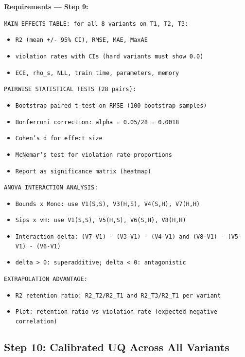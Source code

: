 \documentclass[12pt,a4paper]{article}
\begin{document}
\begin{promptbox}
\textbf{Requirements --- Step 9:}

\texttt{MAIN EFFECTS TABLE: for all 8 variants on T1, T2, T3:}
\begin{itemize}[noitemsep]
  \item \texttt{R2 (mean +/- 95\% CI), RMSE, MAE, MaxAE}
  \item \texttt{violation rates with CIs (hard variants must show 0.0)}
  \item \texttt{ECE, rho\_s, NLL, train time, parameters, memory}
\end{itemize}

\texttt{PAIRWISE STATISTICAL TESTS (28 pairs):}
\begin{itemize}[noitemsep]
  \item \texttt{Bootstrap paired t-test on RMSE (100 bootstrap samples)}
  \item \texttt{Bonferroni correction: alpha = 0.05/28 = 0.0018}
  \item \texttt{Cohen's d for effect size}
  \item \texttt{McNemar's test for violation rate proportions}
  \item \texttt{Report as significance matrix (heatmap)}
\end{itemize}

\texttt{ANOVA INTERACTION ANALYSIS:}
\begin{itemize}[noitemsep]
  \item \texttt{Bounds x Mono: use V1(S,S), V3(H,S), V4(S,H), V7(H,H)}
  \item \texttt{Sips x vH: use V1(S,S), V5(H,S), V6(S,H), V8(H,H)}
  \item \texttt{Interaction delta: (V7-V1) - (V3-V1) - (V4-V1)
    and (V8-V1) - (V5-V1) - (V6-V1)}
  \item \texttt{delta > 0: superadditive; delta < 0: antagonistic}
\end{itemize}

\texttt{EXTRAPOLATION ADVANTAGE:}
\begin{itemize}[noitemsep]
  \item \texttt{R2 retention ratio: R2\_T2/R2\_T1 and R2\_T3/R2\_T1
    per variant}
  \item \texttt{Plot: retention ratio vs violation rate (expected
    negative correlation)}
\end{itemize}
\end{promptbox}

\subsection{Step 10: Calibrated UQ Across All Variants}
\end{document}
